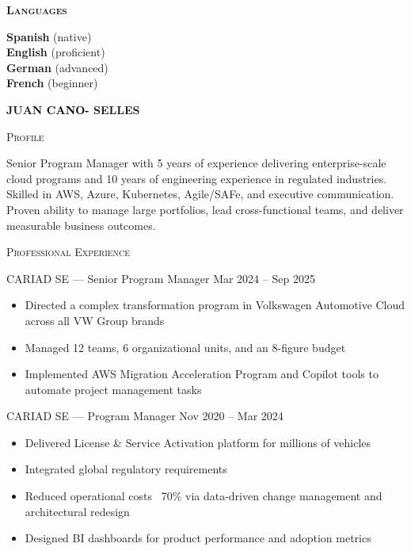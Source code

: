 \documentclass[11pt, a4paper]{article}
\newcommand{\headleft}[1]{\vspace*{2ex}\textsc{\textbf{\color{softwhite}#1}}\par%
    \vspace*{-1.2ex}{\color{softwhite}\hrulefill}\par\vspace*{0.7ex}}
\newcommand{\headright}[1]{\vspace*{2ex}\hspace*{-1mm}%
    \textsc{\large\color{cvblue}#1}\par%
    \vspace*{-1.8ex}{\color{cvblue}\hrulefill}\par}
\begin{document}
\begin{minipage}[t]{0.40\textwidth}
{\begin{minipage}[t][\textheight][t]{0.68\textwidth}
\headleft{Languages}
\textbf{Spanish} (native) \\[0.5ex]
\textbf{English} (proficient) \\[0.5ex]
\textbf{German} (advanced) \\[0.5ex]
\textbf{French} (beginner)

\end{minipage}}
\end{minipage}%
\hspace{0.5mm} %
\begin{minipage}[t]{0.59\textwidth}
\setlength{\parskip}{1ex}
\setlength{\rightskip}{4mm} %

\vspace*{8mm} %
{\fontsize{28}{30}\sffont\bfseries
\textcolor{cvblue}{JUAN} \textcolor{black}{CANO-}%
\textcolor{cvblue}{SELLES}}\par
\vspace*{1ex} %

\headright{Profile}
Senior Program Manager with 5 years of experience delivering enterprise-scale cloud programs and 10 years of engineering experience in regulated industries. Skilled in AWS, Azure, Kubernetes, Agile/SAFe, and executive communication. Proven ability to manage large portfolios, lead cross-functional teams, and deliver measurable business outcomes.

\headright{Professional Experience}

\noindent\textsc{CARIAD SE} --- Senior Program Manager \hfill Mar 2024 -- Sep 2025
\begin{itemize}[leftmargin=*, label=--, itemsep=0.5ex]
\item Directed a complex transformation program in Volkswagen Automotive Cloud across all VW Group brands
\item Managed 12 teams, 6 organizational units, and an 8-figure budget
\item Implemented AWS Migration Acceleration Program and Copilot tools to automate project management tasks
\end{itemize}

\noindent\textsc{CARIAD SE} --- Program Manager \hfill Nov 2020 -- Mar 2024
\begin{itemize}[leftmargin=*, label=--, itemsep=0.5ex]
\item Delivered License \& Service Activation platform for millions of vehicles
\item Integrated global regulatory requirements
\item Reduced operational costs ~70\% via data-driven change management and architectural redesign
\item Designed BI dashboards for product performance and adoption metrics
\end{itemize}


\end{minipage}
\end{document}
